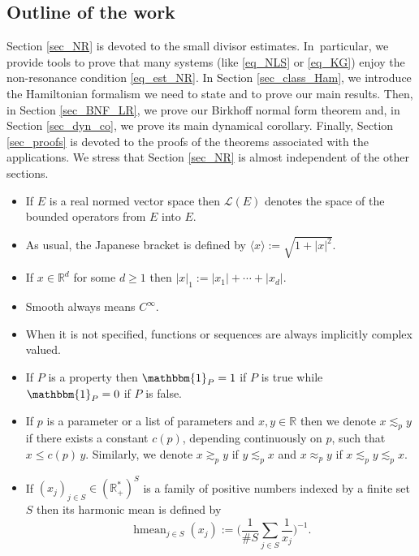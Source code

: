 \subsection{Outline of the work} Section \ref{sec_NR} is devoted to the small divisor estimates. In~particular, we provide tools to prove that many systems (like \eqref{eq_NLS} or \eqref{eq_KG}) enjoy the non-resonance condition \eqref{eq_est_NR}. In Section \ref{sec_class_Ham}, we introduce the Hamiltonian formalism we need to state and to prove our main results. Then, in Section \ref{sec_BNF_LR}, we prove our Birkhoff normal form theorem and, in Section \ref{sec_dyn_co}, we prove its main dynamical corollary. Finally, Section \ref{sec_proofs} is devoted to the proofs of the theorems associated with the applications. We stress that Section \ref{sec_NR} is almost independent of the other sections.


\begin{itemize}
\item
If $E$ is a real normed vector space then $\mathscr{L}(E)$ denotes the space of the bounded operators from $E$ into $E$.

\item
As usual, the Japanese bracket is defined by $\langle x\rangle:= \sqrt{1+|x|^2}$.

\item
If $x\in \mathbb{R}^d$ for some $d\geq 1$ then $|x|_1:=|x_1|+\cdots+|x_d|$.

\item
Smooth always means $C^\infty$.

\item
When it is not specified, functions or sequences are always implicitly complex valued.

\item
If $P$ is a property then $\mathbbm{1}_P = 1$ if $P$ is true while $\mathbbm{1}_P = 0$ if $P$ is false.

\item
If $p$ is a parameter or a list of parameters and $x,y\in \mathbb{R}$ then we denote $x\lesssim_p y$ if there exists a constant $c(p)$, depending continuously on $p$, such that $x\leq c(p) \, y$. Similarly, we denote $x\gtrsim_p y$ if $y\lesssim_p x$ and $x\approx_p y$ if $x\lesssim_p y\lesssim_p x$.

\item
If $(x_j)_{j\in S} \in (\mathbb{R}_{+}^*)^S$ is a family of positive numbers indexed by a finite set $S$ then its harmonic mean is defined by
\begin{equation}
\label{eq_def_hmean}
\mathop{\mathrm{hmean}}_{j\in S} (x_j):=\biggl(\frac1{\# S} \sum_{j\in S} \frac1{x_j} \biggr)^{-1}.
\end{equation}
\end{itemize}

